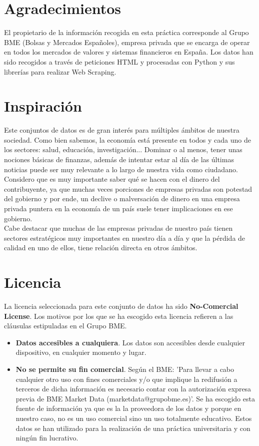 \documentclass[12pt]{article}
\begin{document}
\section*{Agradecimientos}
El propietario de la información recogida en esta práctica corresponde al Grupo BME (Bolsas y Mercados Españoles), empresa privada que se encarga de operar en todos los mercados de valores y sistemas financieros en España.
Los datos han sido recogidos a través de peticiones HTML y procesadas con Python y sus librerías para realizar Web Scraping.

\section*{Inspiración}
Este conjuntos de datos es de gran interés para múltiples ámbitos de nuestra sociedad. Como bien sabemos, la economía está presente en todos y cada uno de los sectores: salud, educación, investigación... Dominar o al menos, tener unas nociones básicas de finanzas, además de intentar estar al día de las últimas noticias puede ser muy relevante a lo largo de nuestra vida como ciudadano.\\

Considero que es muy importante saber qué se hacen con el dinero del contribuyente, ya que muchas veces porciones de empresas privadas son potestad del gobierno y por ende, un declive o malversación de dinero en una empresa privada puntera en la economía de un país suele tener implicaciones en ese gobierno. \\

Cabe destacar que muchas de las empresas privadas de nuestro país tienen sectores estratégicos muy importantes en nuestro día a día y que la pérdida de calidad en uno de ellos, tiene relación directa en otros ámbitos. 

\section*{Licencia}
La licencia seleccionada para este conjunto de datos ha sido \textbf{No-Comercial License}. Los motivos por los que se ha escogido esta licencia refieren a las cláusulas estipuladas en el Grupo BME.
\begin{itemize}
	\item \textbf{Datos accesibles a cualquiera}. Los datos son accesibles desde cualquier dispositivo, en cualquier momento y lugar.
	\item \textbf{No se permite su fin comercial}. Según el BME: 'Para llevar a cabo cualquier otro uso con fines comerciales y/o que implique la redifusión a terceros de dicha información es necesario contar con la autorización expresa previa de BME Market Data (marketdata@grupobme.es)'. Se ha escogido esta fuente de información ya que es la la proveedora de los datos y porque en nuestro caso, no es un uso comercial sino un uso totalmente educativo. Estos datos se han utilizado para la realización de una práctica universitaria y con ningún fin lucrativo.
\end{itemize}
\end{document}
